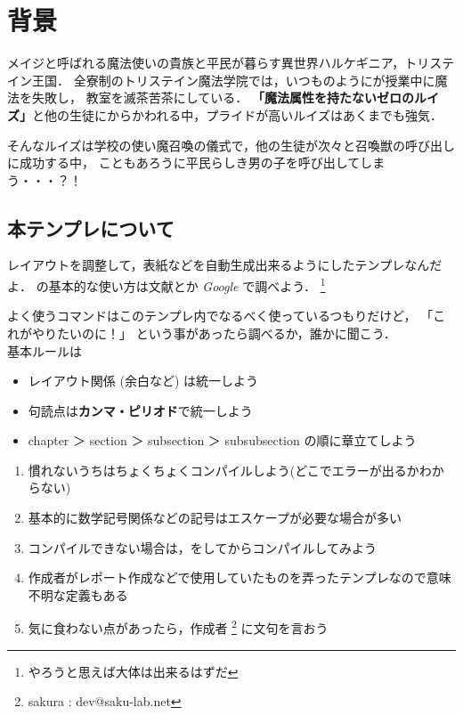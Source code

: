 
\section{背景}
メイジと呼ばれる魔法使いの貴族と平民が暮らす異世界ハルケギニア，トリステイン王国．
全寮制のトリステイン魔法学院では，いつものようにが授業中に魔法を失敗し，
教室を滅茶苦茶にしている．
{\bf 「魔法属性を持たないゼロのルイズ」}と他の生徒にからかわれる中，プライドが高いルイズはあくまでも強気．

そんなルイズは学校の使い魔召喚の儀式で，他の生徒が次々と召喚獣の呼び出しに成功する中，
こともあろうに平民らしき男の子を呼び出してしまう・・・？！\cite{louise}

\subsection{本テンプレについて}
レイアウトを調整して，表紙などを自動生成出来るようにしたテンプレなんだよ．
\LaTeXe の基本的な使い方は文献\cite{latex}とか {\it Google} で調べよう．
\footnote{やろうと思えば大体は出来るはずだ}

よく使うコマンドはこのテンプレ内でなるべく使っているつもりだけど，
「これがやりたいのに！」 という事があったら調べるか，誰かに聞こう．\\

基本ルールは

\begin{itemize}
	\item{レイアウト関係 (余白など) は統一しよう}
	\item{句読点は{\bf カンマ・ピリオド}で統一しよう}
	\item{chapter ＞ section ＞ subsection ＞ subsubsection の順に章立てしよう}
\end{itemize}

\begin{enumerate}
	\item{慣れないうちはちょくちょくコンパイルしよう(どこでエラーが出るかわからない)}
	\item{基本的に数学記号関係などの記号はエスケープが必要な場合が多い}
	\item{コンパイルできない場合は，をしてからコンパイルしてみよう}
	\item{作成者がレポート作成などで使用していたものを弄ったテンプレなので意味不明な定義もある}
	\item{気に食わない点があったら，作成者 \footnote{sakura : dev@saku-lab.net} に文句を言おう}
\end{enumerate}

